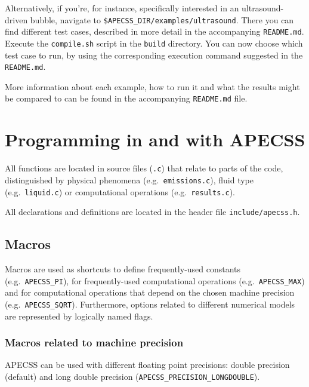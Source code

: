 Alternatively, if you're, for instance, specifically interested in an ultrasound-driven bubble, navigate to {\tt \$APECSS\_DIR/examples/ultrasound}. There you can find different test cases, described in more detail in the accompanying {\tt README.md}. Execute the {\tt compile.sh} script in the {\tt build} directory. You can now choose which test case to run, by using the corresponding execution command suggested in the {\tt README.md}. 

More information about each example, how to run it and what the results might be compared to can be found in the accompanying {\tt README.md} file.

\section{Programming in and with APECSS}

All functions are located in source files ({\tt *.c}) that relate to parts of the code, distinguished by physical phenomena (e.g.~{\tt emissions.c}), fluid type (e.g.~{\tt liquid.c}) or computational operations (e.g.~{\tt results.c}). 

All declarations and definitions are located in the header file {\tt include/apecss.h}. 

\subsection{Macros}

Macros are used as shortcuts to define frequently-used constants (e.g.~{\tt APECSS\_PI}), for frequently-used computational operations (e.g.~{\tt APECSS\_MAX}) and for computational operations that depend on the chosen machine precision (e.g.~{\tt APECSS\_SQRT}). Furthermore, options related to different numerical models are represented by logically named flags.

\subsubsection{Macros related to machine precision}

APECSS can be used with different floating point precisions: double precision (default) and long double precision ({\tt APECSS\_PRECISION\_LONGDOUBLE}).

